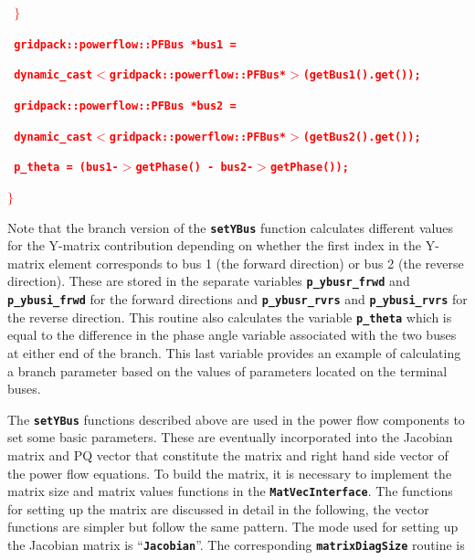\documentclass[12pt]{report} %
\begin{document}
\textcolor{red}{\texttt{\textbf{  $\boldsymbol{\mathrm{\}}}$}}}

\textcolor{red}{\texttt{\textbf{  gridpack::powerflow::PFBus *bus1 =}}}

\textcolor{red}{\texttt{\textbf{    dynamic\_cast$\boldsymbol{\mathrm{<}}$gridpack::powerflow::PFBus*$\boldsymbol{\mathrm{>}}$(getBus1().get());}}}

\textcolor{red}{\texttt{\textbf{  gridpack::powerflow::PFBus *bus2 =}}}

\textcolor{red}{\texttt{\textbf{    dynamic\_cast$\boldsymbol{\mathrm{<}}$gridpack::powerflow::PFBus*$\boldsymbol{\mathrm{>}}$(getBus2().get());}}}

\textcolor{red}{\texttt{\textbf{  p\_theta = (bus1-$\boldsymbol{\mathrm{>}}$getPhase() - bus2-$\boldsymbol{\mathrm{>}}$getPhase());}}}

\textcolor{red}{\texttt{\textbf{$\boldsymbol{\mathrm{\}}}$}}}

Note that the branch version of the \texttt{\textbf{setYBus}} function calculates different values for the Y-matrix contribution depending on whether the first index in the Y-matrix element corresponds to bus 1 (the forward direction) or bus 2 (the reverse direction). These are stored in the separate variables \texttt{\textbf{p\_ybusr\_frwd}} and \texttt{\textbf{p\_ybusi\_frwd}} for the forward directions and \texttt{\textbf{p\_ybusr\_rvrs}} and \texttt{\textbf{p\_ybusi\_rvrs}} for the reverse direction. This routine also calculates the variable \texttt{\textbf{p\_theta}} which is equal to the difference in the phase angle variable associated with the two buses at either end of the branch. This last variable provides an example of calculating a branch parameter based on the values of parameters located on the terminal buses.

The \texttt{\textbf{setYBus}} functions described above are used in the power flow components to set some basic parameters. These are eventually incorporated into the Jacobian matrix and PQ vector that constitute the matrix and right hand side vector of the power flow equations. To build the matrix, it is necessary to implement the matrix size and matrix values functions in the \texttt{\textbf{MatVecInterface}}. The functions for setting up the matrix are discussed in detail in the following, the vector functions are simpler but follow the same pattern. The mode used for setting up the Jacobian matrix is ``\texttt{\textbf{Jacobian}}''. The corresponding \texttt{\textbf{matrixDiagSize}} routine is
\end{document}
